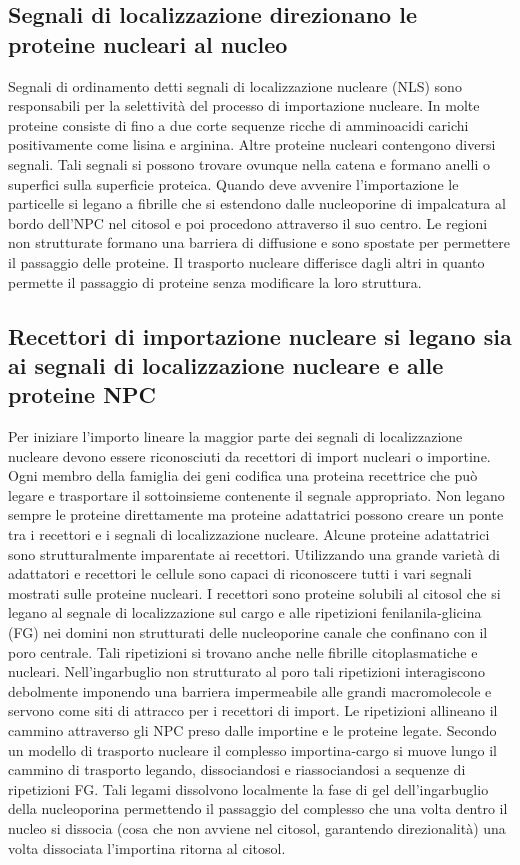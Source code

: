 \subsection{Segnali di localizzazione direzionano le proteine nucleari al nucleo}
Segnali di ordinamento detti segnali di localizzazione nucleare (NLS) sono responsabili per la selettivit\`a del processo di importazione nucleare. In molte proteine consiste di fino a
due corte sequenze ricche di amminoacidi carichi positivamente come lisina e arginina. Altre proteine nucleari contengono diversi segnali. Tali segnali si possono trovare ovunque nella
catena e formano anelli o superfici sulla superficie proteica. Quando deve avvenire l'importazione le particelle si legano a fibrille che si estendono dalle nucleoporine di impalcatura
al bordo dell'NPC nel citosol e poi procedono attraverso il suo centro. Le regioni non strutturate formano una barriera di diffusione e sono spostate per permettere il passaggio delle
proteine. Il trasporto nucleare differisce dagli altri in quanto permette il passaggio di proteine senza modificare la loro struttura.
\subsection{Recettori di importazione nucleare si legano sia ai segnali di localizzazione nucleare e alle proteine NPC}
Per iniziare l'importo lineare la maggior parte dei segnali di localizzazione nucleare devono essere riconosciuti da recettori di import nucleari o importine. Ogni membro della famiglia
dei geni codifica una proteina recettrice che pu\`o legare e trasportare il sottoinsieme contenente il segnale appropriato. Non legano sempre le proteine direttamente ma proteine 
adattatrici possono creare un ponte tra i recettori e i segnali di localizzazione nucleare. Alcune proteine adattatrici sono strutturalmente imparentate ai recettori. Utilizzando una
grande variet\`a di adattatori e recettori le cellule sono capaci di riconoscere tutti i vari segnali mostrati sulle proteine nucleari. I recettori sono proteine solubili al citosol che
si legano al segnale di localizzazione sul cargo e alle ripetizioni fenilanila-glicina (FG) nei domini non strutturati delle nucleoporine canale che confinano con il poro centrale. Tali
ripetizioni si trovano anche nelle fibrille citoplasmatiche e nucleari. Nell'ingarbuglio non strutturato al poro tali ripetizioni interagiscono debolmente imponendo una barriera 
impermeabile alle grandi macromolecole e servono come siti di attracco per i recettori di import. Le ripetizioni allineano il cammino attraverso gli NPC preso dalle importine e le 
proteine legate. Secondo un modello di trasporto nucleare il complesso importina-cargo si muove lungo il cammino di trasporto legando, dissociandosi e riassociandosi a sequenze di
ripetizioni FG. Tali legami dissolvono localmente la fase di gel dell'ingarbuglio della nucleoporina  permettendo il passaggio del complesso che una volta dentro il nucleo si dissocia
(cosa che non avviene nel citosol, garantendo direzionalit\`a) una volta dissociata l'importina ritorna al citosol.
